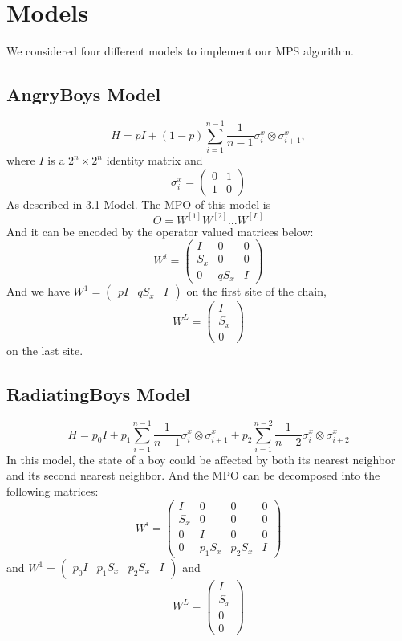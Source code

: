 
\section{Models}
We considered four different models to implement our MPS algorithm.
\subsection{AngryBoys Model}
\begin{displaymath}
H = pI + (1-p)\sum_{i=1}^{n-1}\frac{1}{n-1}\sigma_i^x\otimes\sigma_{i+1}^x,
\end{displaymath}
where $I$ is a $2^n\times2^n$ identity matrix and 
\begin{displaymath}
\sigma_i^x = 
\begin{pmatrix}
0 & 1 \\
1 & 0
\end{pmatrix}
\end{displaymath}
As described in 3.1 Model.
The MPO of this model is 
$$
O=W^{[1]}W^{[2]} ... W^{[L]}
$$
And it can be encoded by the operator valued matrices below:
$$
W^{i}=
\begin{pmatrix}
I & 0 & 0 \\
S_x & 0 & 0 \\
0 & qS_x & I
\end{pmatrix}
$$
And  we have $W^1=\begin{pmatrix}p I & q S_x & I\end{pmatrix}$ on the first site of the chain, 
$$W^L=\begin{pmatrix}
I \\ S_x \\ 0
\end{pmatrix}$$
on the last site.

\subsection{RadiatingBoys Model}
\begin{displaymath}
H=p_0 I + p_1 \sum_{i=1}^{n-1}\frac{1}{n-1}\sigma_i^x\otimes\sigma_{i+1}^x + p_2 \sum_{i=1}^{n-2}\frac{1}{n-2}\sigma_i^x\otimes\sigma_{i+2}^x
\end{displaymath}
In this model, the state of a boy could be affected by both its nearest neighbor and its second nearest neighbor. And the MPO can be decomposed into the following matrices:
$$
W^{i}=
\begin{pmatrix}
I & 0 & 0 & 0 \\
S_x & 0 & 0 & 0 \\
0 & I & 0 & 0 \\
0 & p_1 S_x & p_2 S_x & I
\end{pmatrix}
$$
and $W^1=\begin{pmatrix}p_0 I & p_1 S_x & p_2 S_x & I\end{pmatrix}$ and 
$$W^L=
\begin{pmatrix}
I \\ S_x \\ 0 \\0
\end{pmatrix}$$


